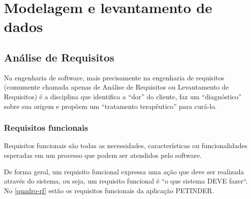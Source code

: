 \chapter{Modelagem e levantamento de dados}

\section{Análise de Requisitos}
Na engenharia de software, mais precisamente na engenharia de requisitos (comumente chamada apenas de Análise de Requisitos ou Levantamento de Requisitos) é a disciplina que identifica a “dor” do cliente, faz um “diagnóstico” sobre sua origem e propõem um “tratamento terapêutico” para curá-lo.

\subsection{Requisitos funcionais}
Requisitos funcionais são todas as necessidades, características ou funcionalidades esperadas em um processo que podem ser atendidos pelo software.

De forma geral, um requisito funcional expressa uma ação que deve ser realizada através do sistema, ou seja, um requisito funcional é “o que sistema DEVE fazer“.  No \autoref{quadro-rf} estão os requisitos funcionais da aplicação PETINDER.

